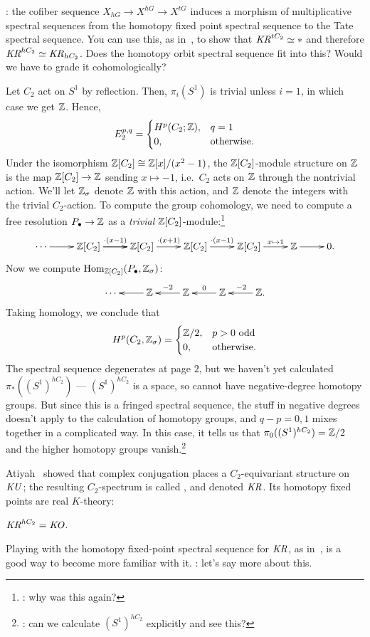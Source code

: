 \TODO: the cofiber sequence $X_{hG}\to X^{hG}\to X^{tG}$ induces a morphism of multiplicative spectral sequences
from the homotopy fixed point spectral sequence to the Tate spectral sequence. You can use this, as
in~\cite[Prop.~11]{HS14}, to show that $\mathit{KR}^{tC_2}\simeq *$ and therefore $\mathit{KR}^{hC_2}\simeq\mathit{KR}_{hC_2}$. Does the
homotopy orbit spectral sequence fit into this? Would we have to grade it cohomologically?
\begin{exm}
\label{reflection}
Let $C_2$ act on $S^1$ by reflection. Then, $\pi_i(S^1)$ is trivial unless $i = 1$, in which case we get $\mathbb Z$.
Hence,
\[E_2^{p,q} = \begin{cases}
	H^p(C_2;\mathbb Z), &q = 1\\
	0, &\text{otherwise}.
\end{cases}\]
Under the isomorphism $\mathbb Z[C_2]\cong \mathbb Z[x]/(x^2-1)$, the $\mathbb Z[C_2]$-module structure on $\mathbb Z$ is the map
$\mathbb Z[C_2]\to\mathbb Z$ sending $x\mapsto -1$, i.e.\ $C_2$ acts on $\mathbb Z$ through the nontrivial action. We'll let $\mathbb Z_\sigma$
denote $\mathbb Z$ with this action, and $\mathbb Z$ denote the integers with the trivial $C_2$-action. To compute the group
cohomology, we need to compute a free resolution $P_\bullet\to\mathbb Z$ as a \emph{trivial}
$\mathbb Z[C_2]$-module:\footnote{\TODO: why was this again?}
\[\xymatrix{
	\dotsb\ar[r] & \Z[C_2]\ar[r]^{\cdot(x-1)}\ar[r] & \Z[C_2]\ar[r]^{\cdot(x+1)} & \Z[C_2]\ar[r]^{\cdot(x-1)} &
	\Z[C_2]\ar[r]^-{x\mapsto 1} & \Z\ar[r] & 0.
}\]
Now we compute $\operatorname{Hom}_{\mathbb Z[C_2]}(P_\bullet, \mathbb Z_\sigma)$:
\[\xymatrix{
	\dotsb & \Z\ar[l] & \Z\ar[l]_{-2} & \Z\ar[l]_0 & \Z.\ar[l]_{-2}
}\]
Taking homology, we conclude that
\[H^p(C_2, \mathbb Z_\sigma) = \begin{cases}
	\mathbb Z/2, &p > 0\text{ odd}\\
	0, &\text{otherwise.}
\end{cases}\]
The spectral sequence degenerates at page $2$, but we haven't yet calculated $\pi_*((S^1)^{hC_2})$ ---
$(S^1)^{hC_2}$ is a space, so cannot have negative-degree homotopy groups. But since this is a fringed spectral
sequence, the stuff in negative degrees doesn't apply to the calculation of homotopy groups, and $q - p = 0,1$
mixes together in a complicated way. In this case, it tells us that $\pi_0((S^1)^{hC_2}) = \mathbb Z/2$ and the higher
homotopy groups vanish.\footnote{\TODO: can we calculate $(S^1)^{hC_2}$ explicitly and see this?}
\end{exm}
\begin{exm}
Atiyah~\cite{AtiyahKR} showed that complex conjugation places a $C_2$-equivariant structure on $\mathit{KU}$; the resulting
$C_2$-spectrum is called , and denoted $\mathit{KR}$. Its homotopy fixed points are real $K$-theory:
\begin{thm}
$\mathit{KR}^{hC_2} = \mathit{KO}$.
\end{thm}
Playing with the homotopy fixed-point spectral sequence for $\mathit{KR}$, as in~\cite{HS14}, is a good way to become more
familiar with it. \TODO: let's say more about this.
\end{exm}
